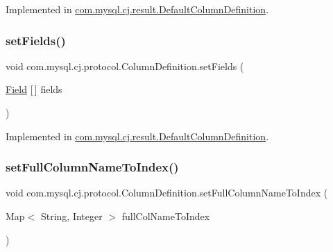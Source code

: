 Implemented in \mbox{\hyperlink{classcom_1_1mysql_1_1cj_1_1result_1_1_default_column_definition_a8c6cb26318321620cc702e53a480d28f}{com.\+mysql.\+cj.\+result.\+Default\+Column\+Definition}}.

\mbox{\label{interfacecom_1_1mysql_1_1cj_1_1protocol_1_1_column_definition_a795612d44026e85eedca7443f4f47381}} 
\subsubsection{\texorpdfstring{set\+Fields()}{setFields()}}
{\footnotesize\ttfamily void com.\+mysql.\+cj.\+protocol.\+Column\+Definition.\+set\+Fields (\begin{DoxyParamCaption}\item[{\mbox{\hyperlink{classcom_1_1mysql_1_1cj_1_1result_1_1_field}{Field}} \mbox{[}$\,$\mbox{]}}]{fields }\end{DoxyParamCaption})}



Implemented in \mbox{\hyperlink{classcom_1_1mysql_1_1cj_1_1result_1_1_default_column_definition_af37a2815b566bd95c2109c7649adf6f7}{com.\+mysql.\+cj.\+result.\+Default\+Column\+Definition}}.

\mbox{\label{interfacecom_1_1mysql_1_1cj_1_1protocol_1_1_column_definition_a75168874688cd04aa48f269036d2227d}} 
\subsubsection{\texorpdfstring{set\+Full\+Column\+Name\+To\+Index()}{setFullColumnNameToIndex()}}
{\footnotesize\ttfamily void com.\+mysql.\+cj.\+protocol.\+Column\+Definition.\+set\+Full\+Column\+Name\+To\+Index (\begin{DoxyParamCaption}\item[{Map$<$ String, Integer $>$}]{full\+Col\+Name\+To\+Index }\end{DoxyParamCaption})}



